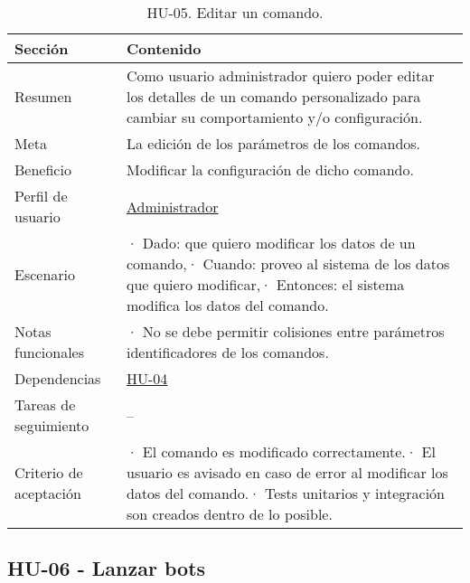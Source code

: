 \begin{table}[H]
    \centering
    \def\arraystretch{1.25}
    \begin{adjustbox}{max width=\textwidth}
    \begin{tabularx}{\textwidth}{|l|L|}
    \hline
        \textbf{Sección} & \textbf{Contenido} \\ \hline
    \hline
        Resumen & Como usuario administrador quiero poder editar los detalles de un comando personalizado para cambiar su comportamiento y/o configuración. \\ \hline
        Meta & La edición de los parámetros de los comandos. \\ \hline
        Beneficio & Modificar la configuración de dicho comando. \\ \hline
        Perfil de usuario & \hyperref[sec:personaAdmin]{Administrador} \\ \hline
        Escenario & · Dado: que quiero modificar los datos de un comando,\linebreak · Cuando: proveo al sistema de los datos que quiero modificar,\linebreak · Entonces: el sistema modifica los datos del comando. \\ \hline
        Notas funcionales & · No se debe permitir colisiones entre parámetros identificadores de los comandos. \\ \hline
        Dependencias & \hyperref[sec:hu04]{HU-04} \\ \hline
        Tareas de seguimiento & – \\ \hline
        Criterio de aceptación & · El comando es modificado correctamente.\linebreak · El usuario es avisado en caso de error al modificar los datos del comando.\linebreak · Tests unitarios y integración son creados dentro de lo posible. \\ \hline
    \end{tabularx}
    \end{adjustbox}
    \caption{HU-05. Editar un comando.}
\end{table}

\subsection{HU-06 - Lanzar bots}
\label{sec:hu06}

